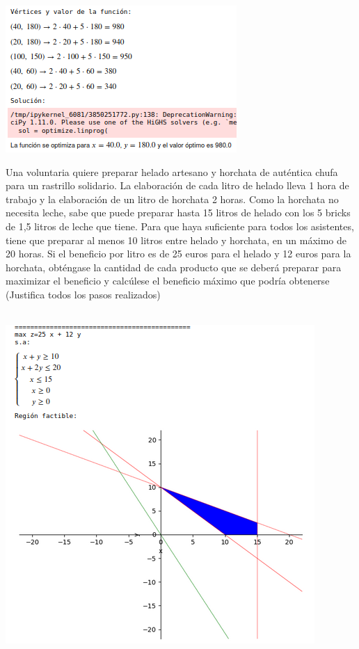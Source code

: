 \documentclass[addpoints,spanish, 12pt,a4paper]{exam}
\begin{document}
\begin{questions}
\begin{solution}
\includegraphics[scale=0.8]{prglin2}
\end{solution}

\question[3] Una voluntaria quiere preparar helado artesano y horchata de
auténtica chufa para un rastrillo solidario. La elaboración de cada litro de helado lleva 1 hora
de trabajo y la elaboración de un litro de horchata 2 horas. Como la horchata no necesita leche,
sabe que puede preparar hasta 15 litros de helado con los 5 bricks de 1,5 litros de leche que tiene. Para que haya suficiente
para todos los asistentes, tiene que preparar al menos 10 litros entre helado y horchata, en un
máximo de 20 horas. Si el beneficio por litro es de 25 euros para el helado y 12 euros para la horchata, obténgase
la cantidad de cada producto que se deberá preparar para maximizar el beneficio y calcúlese
el beneficio máximo que podría obtenerse (Justifica todos los pasos realizados)
\begin{solution}\\
\includegraphics[scale=0.5]{prglin3}\\

\end{solution}
\end{questions}
\end{document}
